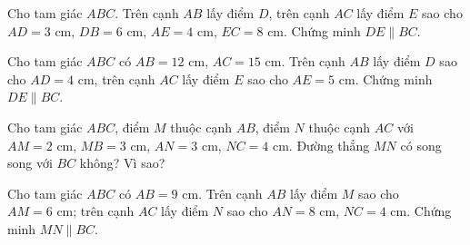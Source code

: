 

\begin{bt}%
	Cho tam giác $ABC$. Trên cạnh $AB$ lấy điểm $D$, trên cạnh $AC$ lấy điểm $E$ sao cho $AD=3\text{ cm}$, $DB=6\text{ cm}$, $AE=4\text{ cm}$, $EC=8\text{ cm}$. Chứng minh $DE\parallel BC$.
\end{bt}

\begin{bt}%
	Cho tam giác $ABC$ có $AB=12\text{ cm}$, $AC=15\text{ cm}$. Trên cạnh $AB$ lấy điểm $D$ sao cho $AD=4\text{ cm}$, trên cạnh $AC$ lấy điểm $E$ sao cho $AE=5\text{ cm}$. Chứng minh $DE\parallel BC$.
\end{bt}

\begin{bt}%
	Cho tam giác $ABC$, điểm $M$ thuộc cạnh $AB$, điểm $N$ thuộc cạnh $AC$ với $AM=2\text{ cm}$, $MB=3\text{ cm}$, $AN=3\text{ cm}$, $NC=4\text{ cm}$. Đường thẳng $MN$ có song song với $BC$ không? Vì sao?
\end{bt}

\begin{bt}%
	Cho tam giác $ABC$ có $AB=9\text{ cm}$. Trên cạnh $AB$ lấy điểm $M$ sao cho $AM=6\text{ cm}$; trên cạnh $AC$ lấy điểm $N$ sao cho $AN=8\text{ cm}$, $NC=4\text{ cm}$. Chứng minh $MN\parallel BC$.
\end{bt}

